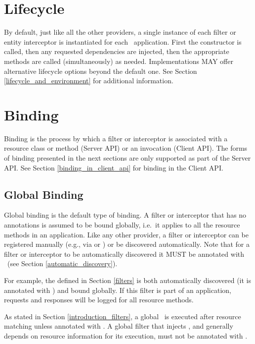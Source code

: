 \section{Lifecycle}

By default, just like all the other providers, a single instance of each filter or entity interceptor is instantiated for each \jaxrs\ application. First the constructor is called, then any requested dependencies are injected, then the appropriate methods are called (simultaneously) as needed. Implementations MAY offer alternative lifecycle options beyond the default one. See Section \ref{lifecycle_and_environment} for additional information.

\section{Binding}

Binding is the process by which a filter or interceptor is associated with a resource class or method (Server API) or an invocation (Client API). The forms of binding presented in the next sections are only supported as part of the Server API. See Section \ref{binding_in_client_api} for binding in the Client API.

\subsection{Global Binding}
\label{global_binding}

Global binding is the default type of binding. A filter or interceptor that has no annotations is assumed to be bound globally, i.e.~it applies to all the resource methods in an application. Like any other provider, a filter or interceptor can be registered manually (e.g., via  or ) or be discovered automatically. Note that for a filter or interceptor to be automatically discovered it MUST be annotated with \Provider\ (see Section \ref{automatic_discovery}). 

For example, the  defined in Section \ref{filters} is both automatically discovered (it is annotated with \Provider) and bound globally. If this filter is part of an application, requests and responses will be logged for all resource methods. 

As stated in Section \ref{introduction_filters}, a global \ContainerRequestFilter\ is executed after resource matching unless annotated with \PreMatching. A global filter that injects , and generally depends on resource information for its execution, must not be annotated with \PreMatching.

